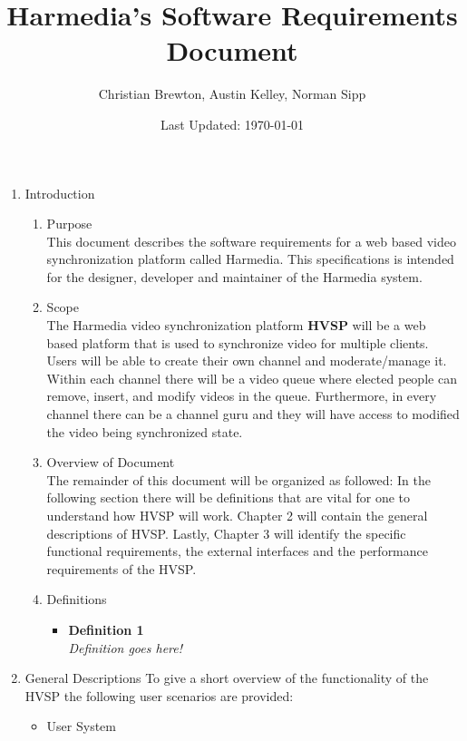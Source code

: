 \documentclass[12pt,a4paper,onesie,titlepage,draft]{article}
\begin{document}
\title{Harmedia's Software Requirements Document}
\author{Christian Brewton, Austin Kelley, Norman Sipp}
\date{Last Updated: \today}
\maketitle

\begin{enumerate}
	\item Introduction
		\begin{enumerate}
			\item Purpose \\
				This document describes the software requirements for a web based video synchronization platform called Harmedia.  This specifications is intended for the designer, developer and maintainer of the Harmedia system.
			\item Scope \\
				The Harmedia video synchronization platform \textbf{HVSP} will be a web based platform that is used to synchronize video for multiple clients.  Users will be able to create their own channel and moderate/manage it.  Within each channel there will be a video queue where elected people can remove, insert, and modify videos in the queue.  Furthermore, in every channel there can be a channel guru and they will have access to modified the video being synchronized state.
			\item Overview of Document \\
				The remainder of this document will be organized as followed: In the following section there will be definitions that are vital for one to understand how HVSP will work.  Chapter 2 will contain the general descriptions of HVSP.  Lastly, Chapter 3  will identify the specific functional requirements, the external interfaces and the performance requirements of the HVSP.
			\item Definitions
				\begin {itemize}
					\item \textbf{Definition 1} \\
						\textit{Definition goes here!}
				\end {itemize}
		\end{enumerate}
	\item General Descriptions
		To give a short overview of the functionality of the HVSP the following user scenarios are provided:
		\begin{itemize}
			\item User System \\

\end{itemize}
\end{enumerate}
\end{document}
